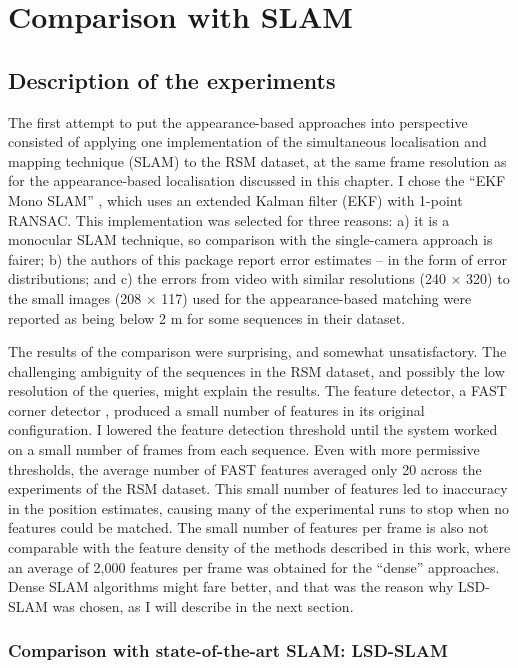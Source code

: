 \section{Comparison with SLAM}
\label{sec:slamcomp}


\subsection{Description of the experiments}

The first attempt to put the appearance-based approaches into perspective consisted of applying one implementation of the simultaneous localisation and mapping technique (SLAM) to the RSM dataset, at the same frame resolution as for the appearance-based  localisation discussed in this chapter. I chose the ``EKF Mono SLAM'' \citep{civera20091}, which uses an extended Kalman filter (EKF) with 1-point RANSAC.  This implementation was selected for three reasons: a) it is a monocular SLAM technique, so comparison with the single-camera approach is fairer; b) the authors of this package report error estimates -- in the form of error distributions; and c) the errors from video with similar resolutions (240 $\times$ 320) to the small images (208 $\times$ 117) used for the appearance-based matching were reported as being below 2 m for some sequences \citep{civera20091} in their dataset.

The results of the comparison were surprising, and somewhat unsatisfactory. The challenging ambiguity of the sequences in the RSM dataset, and possibly the low resolution of the queries, might explain the results. The feature detector, a FAST corner detector \citep{rosten2006machine}, produced a small number of features in its original  configuration. I lowered the feature detection threshold until the system worked on a small number of frames from each sequence. Even with more permissive thresholds, the average number of FAST features averaged only 20 across the experiments of the RSM dataset. This small number of features led to inaccuracy in the position estimates, causing many of the experimental runs to stop when no features could be matched. The small number of features per frame is also not comparable with the feature density of the methods described in this work, where an average of 2,000 features per frame was obtained for the ``dense'' approaches. Dense SLAM algorithms might fare better, and that was the reason why LSD-SLAM was chosen, as I will describe in the next section.

\subsubsection{Comparison with state-of-the-art SLAM: LSD-SLAM}
\label{sec:comparisonSLAM}

